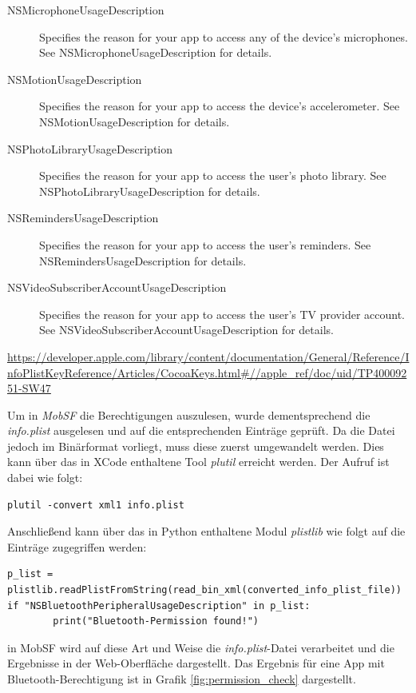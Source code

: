 \begin{description}
	\item[NSMicrophoneUsageDescription] Specifies the reason for your app to access any of the device’s microphones. See NSMicrophoneUsageDescription for details.
	\item[NSMotionUsageDescription] Specifies the reason for your app to access the device’s accelerometer. See NSMotionUsageDescription for details.
	\item[NSPhotoLibraryUsageDescription] Specifies the reason for your app to access the user’s photo library. See NSPhotoLibraryUsageDescription for details.
	\item[NSRemindersUsageDescription] Specifies the reason for your app to access the user’s reminders. See NSRemindersUsageDescription for details.
	\item[NSVideoSubscriberAccountUsageDescription] Specifies the reason for your app to access the user’s TV provider account. See NSVideoSubscriberAccountUsageDescription for details.
\end{description}

\url{https://developer.apple.com/library/content/documentation/General/Reference/InfoPlistKeyReference/Articles/CocoaKeys.html#//apple_ref/doc/uid/TP40009251-SW47}

Um in \textit{MobSF} die Berechtigungen auszulesen, wurde dementsprechend die \textit{info.plist} ausgelesen und auf die entsprechenden Einträge geprüft. Da die Datei jedoch im Binärformat vorliegt, muss diese zuerst umgewandelt werden. Dies kann über das in XCode enthaltene Tool \textit{plutil} erreicht werden. Der Aufruf ist dabei wie folgt:
\begin{lstlisting}
plutil -convert xml1 info.plist
\end{lstlisting}
Anschließend kann über das in Python enthaltene Modul \textit{plistlib} wie folgt auf die Einträge zugegriffen werden:
\begin{lstlisting}
p_list = plistlib.readPlistFromString(read_bin_xml(converted_info_plist_file))
if "NSBluetoothPeripheralUsageDescription" in p_list:
        print("Bluetooth-Permission found!")
\end{lstlisting}

in MobSF wird auf diese Art und Weise die \textit{info.plist}-Datei verarbeitet und die Ergebnisse in der Web-Oberfläche dargestellt. Das Ergebnis für eine App mit Bluetooth-Berechtigung ist in Grafik \ref{fig:permission_check} dargestellt.

